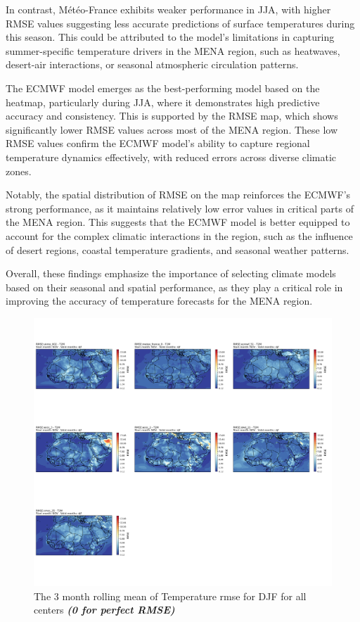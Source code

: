 In contrast, Météo-France exhibits weaker performance in JJA, with higher RMSE values suggesting less accurate predictions of surface temperatures during this season. This could be attributed to the model's limitations in capturing summer-specific temperature drivers in the MENA region, such as heatwaves, desert-air interactions, or seasonal atmospheric circulation patterns.

The ECMWF model emerges as the best-performing model based on the heatmap, particularly during JJA, where it demonstrates high predictive accuracy and consistency. This is supported by the RMSE map, which shows significantly lower RMSE values across most of the MENA region. These low RMSE values confirm the ECMWF model's ability to capture regional temperature dynamics effectively, with reduced errors across diverse climatic zones.

Notably, the spatial distribution of RMSE on the map reinforces the ECMWF's strong performance, as it maintains relatively low error values in critical parts of the MENA region. This suggests that the ECMWF model is better equipped to account for the complex climatic interactions in the region, such as the influence of desert regions, coastal temperature gradients, and seasonal weather patterns.

Overall, these findings emphasize the importance of selecting climate models based on their seasonal and spatial performance, as they play a critical role in improving the accuracy of temperature forecasts for the MENA region.



\begin{figure}[H]
    \centering
    \includegraphics[width=1\linewidth]{plots/det/rmse/rmse_djf_t2m.png}
    \caption{The 3 month rolling mean of Temperature rmse for DJF for all centers \textbf{\textit{(0 for perfect RMSE)} }}
\end{figure}

